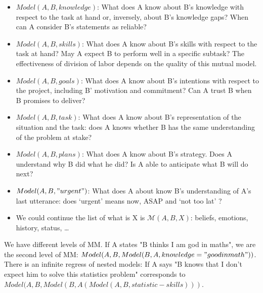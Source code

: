 \documentclass{report}
\newcommand{\model}[3]{{$\mathcal{M}(#1, #2, #3)$}}
\begin{document}
\begin{itemize}

    \item $Model(A,B, knowledge)$: What does A know about B's knowledge with
        respect to the task at hand or, inversely, about B's knowledge gaps?
        When can A consider B's statements as reliable? 

    \item $Model(A,B, skills)$: What does A know about B's skills with respect to
        the task at hand? May A expect B to perform well in a specific subtask?
        The effectiveness of division of labor depends on the quality of this
        mutual model. 

    \item $Model(A,B, goals)$: What does A know about B's intentions with respect
        to the project, including B' motivation and commitment? Can A trust B
        when B promises to deliver? 

    \item $Model(A,B, task)$: What does A know about B's representation of the
        situation and the task: does A knows whether B has the same
        understanding of the problem at stake? 

    \item $Model(A,B, plans)$: What does A know about B's strategy. Does A
        understand why B did what he did? Is A able to anticipate what B will do
        next? 

    \item $Model(A,B, "urgent")$: What does A about know B's understanding of A's
        last utterance: does ‘urgent’ means now, ASAP and ‘not too lat’ ?

    \item We could continue the list of what is X is \model{A}{B}{X}: beliefs,
        emotions, history, status, …

\end{itemize}

We have different levels of MM. If A states "B thinks I am god in maths", we
are the second level of MM:  $Model(A, B, Model(B,A, knowledge="good in
math"))$. There is an infinite regress of nested models: If A says "B knows that
I don't expect him to solve this statistics problem" corresponds to $Model(A, B,
Model (B, A (Model (A,B, statistic-skills)))$.
\end{document}
